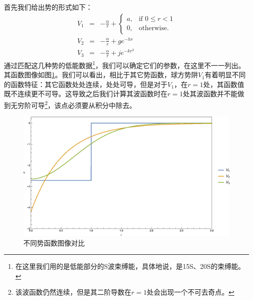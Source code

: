 \documentclass[cs4size,titlepage,twoside]{ctexart}
\begin{document}
首先我们给出势的形式如下：
\begin{eqnarray}
	V_1&=&-\frac{\alpha}{r}+\begin{cases}
	a, & \mbox{if } 0\leq r<1 \\
	0, & \mbox{otherwise}.
	\end{cases}\\
	V_2&=&-\frac{\alpha}{r}+g e^{-hr}\\
	V_3&=&-\frac{\alpha}{r}+je^{-kr^2}
\end{eqnarray}
通过匹配这几种势的低能数据\footnote{在这里我们用的是低能部分的S波束缚能，具体地说，是15S、20S的束缚能。}，我们可以确定它们的参数，在这里不一一列出。其函数图像如图\ref{MP}。我们可以看出，相比于其它势函数，球方势阱$V_1$有着明显不同的函数特征：其它函数处处连续，处处可导，但是对于$V_1$，在$r=1$处，其函数值既不连续更不可导。这导致之后我们计算其波函数时在$r=1$处其波函数并不能做到无穷阶可导\footnote{该波函数仍然连续，但是其二阶导数在$r=1$处会出现一个不可去奇点。}，该点必须要从积分中除去。
\begin{figure}[!tbp]
	\centering
	\includegraphics[width=6in]{MultiplePotential.eps}
	\caption{不同势函数图像对比}\label{MP}
\end{figure}
\end{document}
